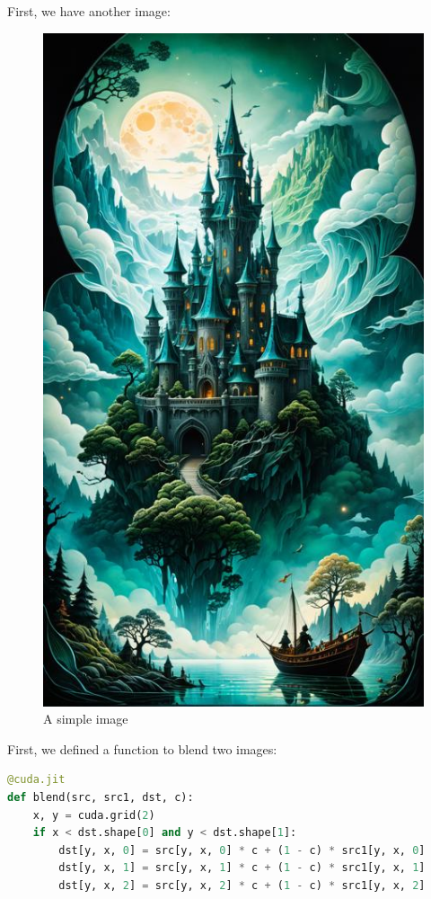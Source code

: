\documentclass[12pt]{article}
\begin{document}
\noindent
First, we have another image:
\begin{figure}[H]
\centering
    \includegraphics[height = 0.5\textheight, keepaspectratio]{images/castle.jpeg}
    \caption{A simple image}
\end{figure}

\noindent
First, we defined a function to blend two images:
\begin{lstlisting}[language=Python]
@cuda.jit
def blend(src, src1, dst, c):
    x, y = cuda.grid(2)
    if x < dst.shape[0] and y < dst.shape[1]:
        dst[y, x, 0] = src[y, x, 0] * c + (1 - c) * src1[y, x, 0]
        dst[y, x, 1] = src[y, x, 1] * c + (1 - c) * src1[y, x, 1]
        dst[y, x, 2] = src[y, x, 2] * c + (1 - c) * src1[y, x, 2]
\end{lstlisting}
\end{document}
